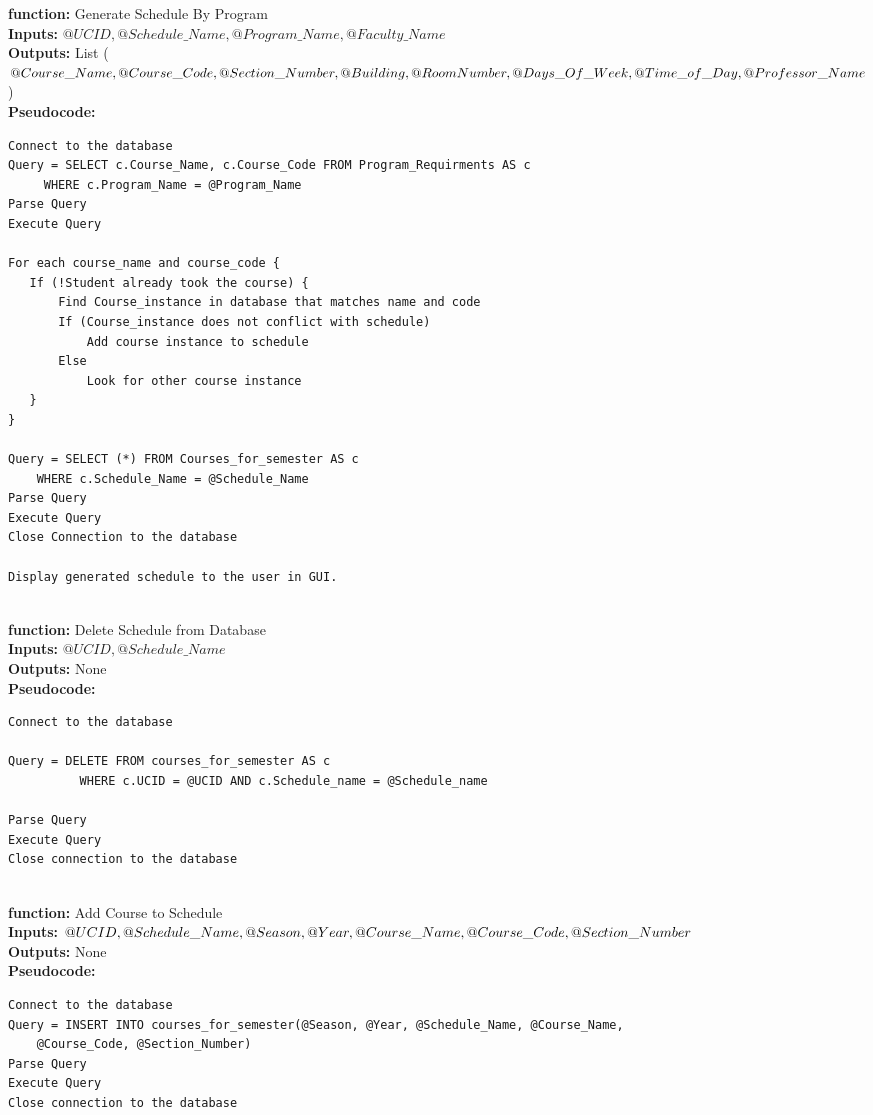 \documentclass[11pt]{article} %
\begin{document}
\textbf{function:} Generate Schedule By Program\\
\textbf{Inputs:} $@UCID, @Schedule\_Name, @Program\_Name, @Faculty\_Name$\\
\textbf{Outputs:} List ($@Course\_Name, @Course\_Code, @Section\_Number, @Building, \\
  @Room Number, @Days\_Of\_Week, @Time\_of\_Day, @Professor\_Name$)\\
\textbf{Pseudocode:} 
\begin{verbatim}
Connect to the database
Query = SELECT c.Course_Name, c.Course_Code FROM Program_Requirments AS c
     WHERE c.Program_Name = @Program_Name
Parse Query
Execute Query

For each course_name and course_code {
   If (!Student already took the course) {
       Find Course_instance in database that matches name and code
       If (Course_instance does not conflict with schedule)
           Add course instance to schedule
       Else
           Look for other course instance
   }
}

Query = SELECT (*) FROM Courses_for_semester AS c 
    WHERE c.Schedule_Name = @Schedule_Name
Parse Query
Execute Query
Close Connection to the database

Display generated schedule to the user in GUI.
\end{verbatim} \\
\textbf{function:} Delete Schedule from Database\\
\textbf{Inputs:} $@UCID, @Schedule\_Name$ \\
\textbf{Outputs:} None\\
\textbf{Pseudocode:} 
\begin{verbatim}
Connect to the database

Query = DELETE FROM courses_for_semester AS c 
          WHERE c.UCID = @UCID AND c.Schedule_name = @Schedule_name

Parse Query
Execute Query
Close connection to the database
\end{verbatim} \\
\textbf{function:} Add Course to Schedule \\
\textbf{Inputs:} $@UCID, @Schedule\_Name, @Season, @Year, @Course\_Name, \\
@Course\_Code, @Section\_Number$ \\
\textbf{Outputs:} None\\
\textbf{Pseudocode:} 
\begin{verbatim}
Connect to the database
Query = INSERT INTO courses_for_semester(@Season, @Year, @Schedule_Name, @Course_Name,
    @Course_Code, @Section_Number)
Parse Query
Execute Query
Close connection to the database
\end{verbatim} \\
\end{document}
